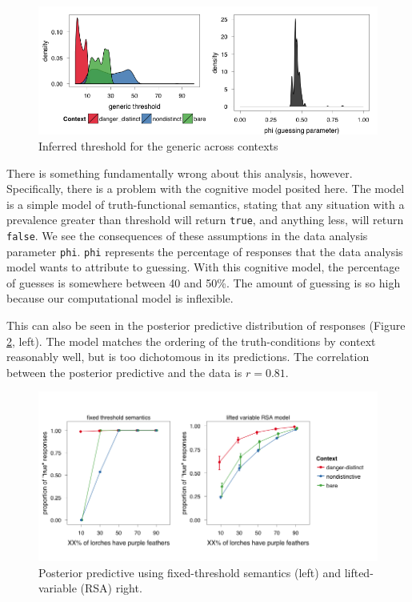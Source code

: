 \documentclass[10pt,letterpaper]{article}
\begin{document}
\begin{figure}
\centering
    \includegraphics[width=\columnwidth]{fig2_bda1_combined}
    \caption{Inferred threshold for the generic across contexts}
  \label{fig:bda1a}
\end{figure}

There is something fundamentally wrong about this analysis, however. Specifically, there is a problem with the cognitive model posited here. The model is a simple model of truth-functional semantics, stating that any situation with a prevalence greater than threshold will return \lstinline{true}, and anything less, will return \lstinline{false}. We see the consequences of these assumptions in the data analysis parameter \lstinline{phi}. \lstinline{phi} represents the percentage of responses that the data analysis model wants to attribute to guessing. With this cognitive model, the percentage of guesses is somewhere between 40 and 50\%. The amount of guessing is so high because our computational model is inflexible.

This can also be seen in the posterior predictive distribution of responses (Figure \ref{fig:bda1posteriorpred}, left). The model matches the ordering of the truth-conditions by context reasonably well, but is too dichotomous in its predictions. The correlation between the posterior predictive and the data is $r = 0.81$. 

\begin{figure}
\centering
    \includegraphics[width=\columnwidth]{fig3_2pps}
    \caption{Posterior predictive using fixed-threshold semantics (left) and lifted-variable (RSA) right.}
  \label{fig:bda1posteriorpred}
\end{figure}
\end{document}
